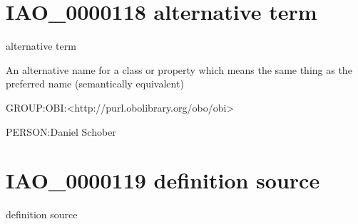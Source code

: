 \documentclass[letterpaper,10pt,english]{sphinxmanual}
\begin{document}
\section{IAO\_0000118 \sphinxhyphen{} alternative term}
\label{\detokenize{doc-IAO_0000118:iao-0000118-alternative-term}}\label{\detokenize{doc-IAO_0000118:index-0}}\label{\detokenize{doc-IAO_0000118::doc}}
\begin{sphinxShadowBox}

\sphinxAtStartPar
alternative term
\end{sphinxShadowBox}

\begin{sphinxShadowBox}

\sphinxAtStartPar
An alternative name for a class or property which means the same thing as the preferred name (semantically equivalent)
\end{sphinxShadowBox}

\begin{sphinxShadowBox}

\sphinxAtStartPar
GROUP:OBI:\textless{}http://purl.obolibrary.org/obo/obi\textgreater{}
\end{sphinxShadowBox}

\begin{sphinxShadowBox}

\sphinxAtStartPar
PERSON:Daniel Schober
\end{sphinxShadowBox}
\begin{quote}
\label{\detokenize{doc-IAO_0000119:iao-0000119}}\label{\detokenize{doc-IAO_0000119:definition-source}}\label{\detokenize{doc-IAO_0000119:iao-0000119}}
\ignorespaces \end{quote}


\section{IAO\_0000119 \sphinxhyphen{} definition source}
\label{\detokenize{doc-IAO_0000119:iao-0000119-definition-source}}\label{\detokenize{doc-IAO_0000119:index-0}}\label{\detokenize{doc-IAO_0000119::doc}}
\begin{sphinxShadowBox}

\sphinxAtStartPar
definition source
\end{sphinxShadowBox}
\end{document}
